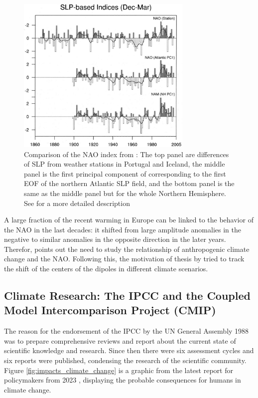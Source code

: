 \begin{figure}[htb]
  \begin{center}
    \includegraphics[width=0.75\textwidth]{figures/hurrel_nao_index_comparison.png}
  \end{center}
  \caption{Comparison of the NAO index from \cite{hurrell_overview_2003}: The top panel are differences of SLP from weather stations in Portugal and Iceland, the middle panel is the first principal component of corresponding to the first EOF of the northern Atlantic SLP field, and the bottom panel is the same as the middle panel but for the whole Northern Hemisphere. See \cite{hurrell_overview_2003} for a more detailed description}
  \label{fig:naoindex_comparison}
\end{figure}

A large fraction of the recent warming in Europe can be linked to the behavior of the NAO in the last decades: it shifted from large amplitude anomalies in the negative to similar anomalies in the opposite direction in the later years. 
Therefor, \citeauthor{hurrell_overview_2003} points out the need to study the relationship of anthropogenic climate change and the NAO. 
Following this, the motivation of thesis \cite{vietinghoff_visual_2021} by \citeauthor{vietinghoff_visual_2021} tried to track the shift of the centers of the dipoles in different climate scenarios.   

\subsection{Climate Research: The IPCC and the Coupled Model Intercomparison Project (CMIP)}


The reason for the endorsement of the IPCC by the UN General Assembly 1988 was to prepare comprehensive reviews and report about the current state of scientific knowledge and research. 
Since then there were six assessment cycles and six reports were published, condensing the research of the scientific community. Figure \ref{fig:impacts_climate_change} is a graphic from the latest report for policymakers from 2023 \cite{lee2024climate}, displaying the probable consequences for humans in climate change.

